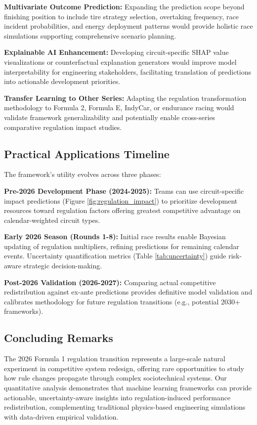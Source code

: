 \documentclass[conference]{IEEEtran}
\begin{document}
\textbf{Multivariate Outcome Prediction:} Expanding the prediction scope beyond finishing position to include tire strategy selection, overtaking frequency, race incident probabilities, and energy deployment patterns would provide holistic race simulations supporting comprehensive scenario planning.

\textbf{Explainable AI Enhancement:} Developing circuit-specific SHAP value visualizations or counterfactual explanation generators would improve model interpretability for engineering stakeholders, facilitating translation of predictions into actionable development priorities.

\textbf{Transfer Learning to Other Series:} Adapting the regulation transformation methodology to Formula 2, Formula E, IndyCar, or endurance racing would validate framework generalizability and potentially enable cross-series comparative regulation impact studies.

\subsection{Practical Applications Timeline}

The framework's utility evolves across three phases:

\textbf{Pre-2026 Development Phase (2024-2025):} Teams can use circuit-specific impact predictions (Figure \ref{fig:regulation_impact}) to prioritize development resources toward regulation factors offering greatest competitive advantage on calendar-weighted circuit types.

\textbf{Early 2026 Season (Rounds 1-8):} Initial race results enable Bayesian updating of regulation multipliers, refining predictions for remaining calendar events. Uncertainty quantification metrics (Table \ref{tab:uncertainty}) guide risk-aware strategic decision-making.

\textbf{Post-2026 Validation (2026-2027):} Comparing actual competitive redistribution against ex-ante predictions provides definitive model validation and calibrates methodology for future regulation transitions (e.g., potential 2030+ frameworks).

\subsection{Concluding Remarks}

The 2026 Formula 1 regulation transition represents a large-scale natural experiment in competitive system redesign, offering rare opportunities to study how rule changes propagate through complex sociotechnical systems. Our quantitative analysis demonstrates that machine learning frameworks can provide actionable, uncertainty-aware insights into regulation-induced performance redistribution, complementing traditional physics-based engineering simulations with data-driven empirical validation.
\end{document}
